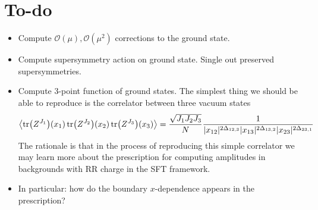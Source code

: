 \documentclass[12pt]{article}
\numberwithin{equation}{section}
\begin{document}
\section{To-do}
\begin{itemize}
    \item Compute $\mathcal{O}(\mu),\mathcal{O}(\mu^2)$ corrections to the ground state.
    \item Compute supersymmetry action on ground state. Single out preserved supersymmetries.
    \item Compute 3-point function of ground states. The simplest thing we should be able to reproduce is the correlator between three vacuum states
    \begin{equation}
        \left\langle \tr(Z^{J_1})(x_1)\tr(Z^{J_2})(x_2)\tr(Z^{J_3})(x_3)\right\rangle=\frac{\sqrt{J_1J_2J_3}}{N}\frac{1}{|x_{12}|^{2\Delta_{12,3}}|x_{13}|^{2\Delta_{13,2}}|x_{23}|^{2\Delta_{23,1}}}
    \end{equation}
    The rationale is that in the process of reproducing this simple correlator we may learn more about the prescription for computing amplitudes in backgrounds with RR charge in the SFT framework.
    \item In particular: how do the boundary $x$-dependence appears in the prescription?
\end{itemize}
\end{document}
